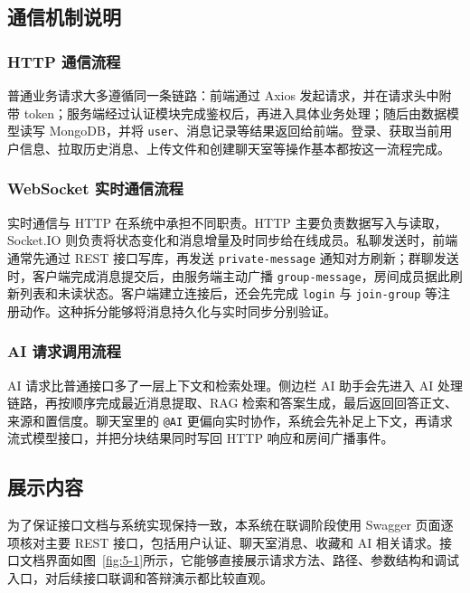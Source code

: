 \subsection{通信机制说明}

\subsubsection{HTTP 通信流程}

普通业务请求大多遵循同一条链路：前端通过 Axios 发起请求，并在请求头中附带 token；服务端经过认证模块完成鉴权后，再进入具体业务处理；随后由数据模型读写 MongoDB，并将 \texttt{user}、消息记录等结果返回给前端。登录、获取当前用户信息、拉取历史消息、上传文件和创建聊天室等操作基本都按这一流程完成\cite{expressdocs2026,mongodbdocs2026}。

\subsubsection{WebSocket 实时通信流程}

实时通信与 HTTP 在系统中承担不同职责。HTTP 主要负责数据写入与读取，Socket.IO 则负责将状态变化和消息增量及时同步给在线成员。私聊发送时，前端通常先通过 REST 接口写库，再发送 \texttt{private-message} 通知对方刷新；群聊发送时，客户端完成消息提交后，由服务端主动广播 \texttt{group-message}，房间成员据此刷新列表和未读状态。客户端建立连接后，还会先完成 \texttt{login} 与 \texttt{join-group} 等注册动作。这种拆分能够将消息持久化与实时同步分别验证\cite{socketiodocs2026}。

\subsubsection{AI 请求调用流程}

AI 请求比普通接口多了一层上下文和检索处理。侧边栏 AI 助手会先进入 AI 处理链路，再按顺序完成最近消息提取、RAG 检索和答案生成，最后返回回答正文、来源和置信度。聊天室里的 \texttt{@AI} 更偏向实时协作，系统会先补足上下文，再请求流式模型接口，并把分块结果同时写回 HTTP 响应和房间广播事件\cite{qaoverview2025,ragsurveycn2025,deepseekrag2026}。

\subsection{展示内容}

为了保证接口文档与系统实现保持一致，本系统在联调阶段使用 Swagger 页面逐项核对主要 REST 接口，包括用户认证、聊天室消息、收藏和 AI 相关请求。接口文档界面如图~\ref{fig:5-1}所示，它能够直接展示请求方法、路径、参数结构和调试入口，对后续接口联调和答辩演示都比较直观。

